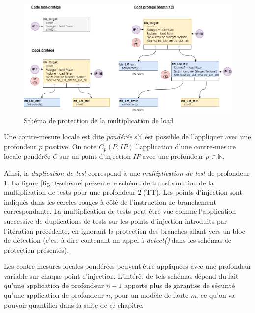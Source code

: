                 \begin{figure}[p]\centering
                    \includegraphics[scale=0.39]{ch5-placement/img/cm-mul-load-full-sep.drawio.png}
                    \caption{Schéma de protection de la multiplication de load}
                    \label{fig:lm-scheme}
                \end{figure}
            
                \begin{defi}
                    \label{def:cm-ponderated}
                    Une contre-mesure locale est dite \textit{pondérée} s'il est possible de l'appliquer avec une profondeur $p$ positive.
                    On note $C_p(P, IP)$ l'application d'une contre-mesure locale pondérée $C$ sur un point d'injection $IP$ avec une profondeur $p \in \mathbb{N}$.
                \end{defi}
                
                Ainsi, la \textit{duplication de test} correspond à une \textit{multiplication de test} de profondeur $1$.
                La figure \ref{fig:tt-scheme} présente le schéma de transformation de la multiplication de tests pour une profondeur $2$ (\gls{TT}). 
                Les points d'injection sont indiqués dans les cercles rouges à côté de l'instruction de branchement correspondante.
                La multiplication de tests peut être vue comme l'application successive de duplications de tests sur les points d'injection introduits par l'itération précédente, en ignorant la protection des branches allant vers un bloc de détection (c'est-à-dire contenant un appel à \textit{detect()} dans les schémas de protection présentés).        
                
                Les contre-mesures locales pondérées peuvent être appliquées avec une profondeur variable sur chaque point d'injection.
                L'intérêt de tels schémas dépend du fait qu'une application de profondeur $n+1$ apporte plus de garanties de sécurité qu'une application de profondeur $n$, pour un modèle de faute $m$, ce qu'on va pouvoir quantifier dans la suite de ce chapitre.
            
